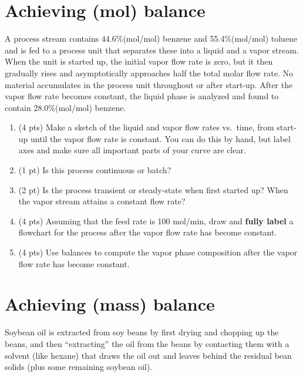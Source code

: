 \documentclass[11pt]{article}
\begin{document}
\section{Achieving (mol) balance}
\label{sec-3}
A process stream contains 44.6\%(mol/mol) benzene and 55.4\%(mol/mol) toluene and is fed to a process unit that separates these into a liquid and a vapor stream.  When the unit is started up, the initial vapor flow rate is zero, but it then gradually rises and asymptotically approaches half the total molar flow rate.  No material accumulates in the process unit throughout or after start-up.  After the vapor flow rate becomes constant, the liquid phase is analyzed and found to contain 28.0\%(mol/mol) benzene.

\begin{enumerate}
\item (4 pts) Make a sketch of the liquid and vapor flow rates vs.~time, from start-up until the vapor flow rate is constant.  You can do this by hand, but label axes and make sure all important parts of your curve are clear.
\item (1 pt) Is this process continuous or batch?
\item (2 pt) Is the process transient or steady-state when first started up?  When the vapor stream attains a constant flow rate?
\item (4 pts) Assuming that the feed rate is 100 mol/min, draw and \textbf{fully label} a flowchart for the process after the vapor flow rate has become constant.
\item (4 pts) Use balances to compute the vapor phase composition after the vapor flow rate has become constant.
\end{enumerate}

\section{Achieving (mass) balance}
\label{sec-4}
Soybean oil is extracted from soy beans by first drying and chopping up the beans, and then ``extracting'' the oil from the beans by contacting them with a solvent (like hexane) that draws the oil out and leaves behind the residual bean solids (plus some remaining soybean oil).
\end{document}
